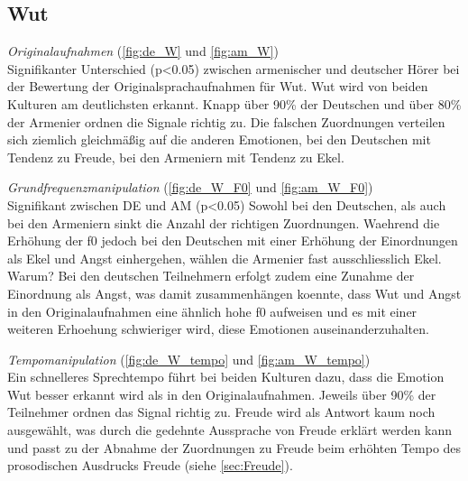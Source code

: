\documentclass[11pt,a4paper,headsepline,twoside,toc=bibliography]{scrreprt}
\begin{document}
\subsection{Wut}
\label{sec:Wut}

\emph{Originalaufnahmen} (\autoref{fig:de_W} und \ref{fig:am_W}) \\
Signifikanter Unterschied (p<0.05) zwischen armenischer und deutscher Hörer bei der Bewertung der Originalsprachaufnahmen für Wut.
Wut wird von beiden Kulturen am deutlichsten erkannt. Knapp über 90\% der Deutschen und über 80\% der Armenier ordnen die Signale richtig zu. Die falschen Zuordnungen verteilen sich ziemlich gleichmäßig auf die anderen Emotionen, bei den Deutschen mit Tendenz zu Freude, bei den Armeniern mit Tendenz zu Ekel.

\noindent
\emph{Grundfrequenzmanipulation} (\autoref{fig:de_W_F0} und \ref{fig:am_W_F0}) \\
Signifikant zwischen DE und AM (p<0.05)
Sowohl bei den Deutschen, als auch bei den Armeniern sinkt die Anzahl der richtigen Zuordnungen. Waehrend die Erhöhung der f0 jedoch bei den Deutschen mit einer Erhöhung der Einordnungen als Ekel und Angst einhergehen, wählen die Armenier fast ausschliesslich Ekel.
Warum?
Bei den deutschen Teilnehmern erfolgt zudem eine Zunahme der Einordnung als Angst, was damit zusammenhängen koennte, dass Wut und Angst in den Originalaufnahmen eine ähnlich hohe f0 aufweisen und es mit einer weiteren Erhoehung schwieriger wird, diese Emotionen auseinanderzuhalten.

\noindent
\emph{Tempomanipulation} (\autoref{fig:de_W_tempo} und \ref{fig:am_W_tempo}) \\
Ein schnelleres Sprechtempo führt bei beiden Kulturen dazu, dass die Emotion Wut besser erkannt wird als in den Originalaufnahmen. Jeweils über 90\% der Teilnehmer ordnen das Signal richtig zu. Freude wird als Antwort kaum noch ausgewählt, was durch die gedehnte Aussprache von Freude erklärt werden kann und passt zu der Abnahme der Zuordnungen zu Freude beim erhöhten Tempo des prosodischen Ausdrucks Freude (siehe \autoref{sec:Freude}).
\end{document}
